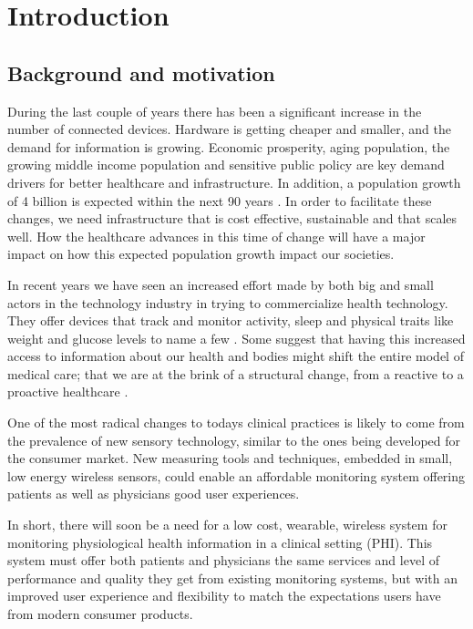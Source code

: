 \section{Introduction} 

\label{sec:introduction}

\subsection{Background and motivation} 

\label{sub:background_and_motivation}

During the last couple of years there has been a significant increase in the number of connected devices. Hardware is getting cheaper and smaller, and the demand for information is growing. Economic prosperity, aging population, the growing middle income population and sensitive public policy are key demand drivers for better healthcare and infrastructure. In addition, a population growth of 4 billion is expected within the next 90 years \cite{WPP2015:Methodology}. In order to facilitate these changes, we need infrastructure that is cost effective, sustainable and that scales well. How the healthcare advances in this time of change will have a major impact on how this expected population growth impact our societies. 

In recent years we have seen an increased effort made by both big and small actors in the technology industry in trying to commercialize health technology. They offer devices that track and monitor activity, sleep and physical traits like weight and glucose levels to name a few \cite{fitbit, fitbit:scale:6}. Some suggest that having this increased access to information about our health and bodies might shift the entire model of medical care; that we are at the brink of a structural change, from a reactive to a proactive healthcare \cite{lynnechou:7, helsit:kari:8, johnmaeda:9, deloitte:healthcare3:0:10}.

One of the most radical changes to todays clinical practices is likely to come from the prevalence of new sensory technology, similar to the ones being developed for the consumer market. New measuring tools and techniques, embedded in small, low energy wireless sensors, could enable an affordable monitoring system offering patients as well as physicians good user experiences.


In short, there will soon be a need for a low cost, wearable, wireless system for monitoring physiological health information in a clinical setting (PHI). This system must offer both patients and physicians the same services and level of performance and quality they get from existing monitoring systems, but with an improved user experience and flexibility to match the expectations users have from modern consumer products. 

